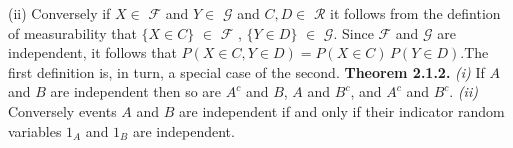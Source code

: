 \documentclass[10pt]{oblivoir}
\begin{document}
\begin{flushleft}(ii) Conversely if $X \in$ $\mathcal{F}$ and $Y \in$ $\mathcal{G}$ and $C,D \in$ $\mathcal{R}$ it follows from the defintion of measurability that $\{ X\in C \}$ $\in$ $\mathcal{F}$ , $\{ Y\in D \}$ $\in$ $\mathcal{G}$. Since $\mathcal{F}$ and $\mathcal{G}$ are independent, it follows that $P(X \in C, Y \in D) = P(X \in C) \, P(Y \in D)$.\linebreak The first definition is, in turn, a special case of the second.
\linebreak
\textbf{Theorem 2.1.2.} \textit{(i)} If $A$ and $B$ are independent then so are $A^c$ and $B$, $A$ and $B^c$, and $A^c$ and $B^c$. \textit{(ii)} Conversely events $A$ and $B$ are independent if and only if their indicator random variables $1_A$ and $1_B$ are independent.
\end{flushleft}
\end{document}
